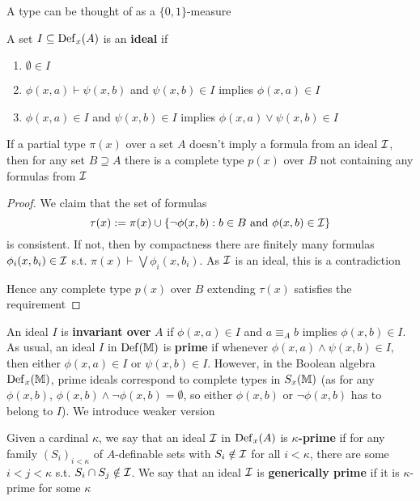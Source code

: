 \documentclass[11pt]{article}
\begin{document}
A type can be thought of as a \(\{0,1\}\)-measure

\begin{definition}[]
A set \(I\subseteq\operatorname{Def}_x(A)\) is an \textbf{ideal} if
\begin{enumerate}
\item \(\emptyset\in I\)
\item \(\phi(x,a)\vdash\psi(x,b)\) and \(\psi(x,b)\in I\) implies \(\phi(x,a)\in I\)
\item \(\phi(x,a)\in I\) and \(\psi(x,b)\in I\) implies \(\phi(x,a)\vee\psi(x,b)\in I\)
\end{enumerate}
\end{definition}

\begin{lemma}
If a partial type \(\pi(x)\) over a set \(A\) doesn't imply a formula from an ideal \(\mathcal{I}\), then
for any set \(B\supseteq A\) there is a complete type \(p(x)\) over \(B\) not containing any formulas
from \(\mathcal{I}\)
\end{lemma}

\begin{proof}
We claim that the set of formulas
\begin{equation*}
\tau(x):=\pi(x)\cup\{\neg\phi(x,b):b\in B\text{ and }\phi(x,b)\in\mathcal{I}\}
\end{equation*}
is consistent. If not, then by compactness there are finitely many formulas \(\phi_i(x,b_i)\in\mathcal{I}\)
s.t. \(\pi(x)\vdash\bigvee\phi_i(x,b_i)\). As \(\mathcal{I}\) is an ideal, this is a contradiction

Hence any complete type \(p(x)\) over \(B\) extending \(\tau(x)\) satisfies the requirement
\end{proof}

An ideal \(I\) is \textbf{invariant over} \(A\) if \(\phi(x,a)\in I\) and \(a\equiv_Ab\) implies \(\phi(x,b)\in I\). As
usual, an ideal \(I\) in \(\operatorname{Def}(\mathbb{M})\) is \textbf{prime} if whenever \(\phi(x,a)\wedge\psi(x,b)\in I\), then
either \(\phi(x,a)\in I\) or \(\psi(x,b)\in I\). However, in the Boolean algebra \(\operatorname{Def}_x(\mathbb{M})\), prime
ideals correspond to complete types in \(S_x(\mathbb{M})\) (as for any \(\phi(x,b)\), \(\phi(x,b)\wedge\neg\phi(x,b)=\emptyset\),
so either \(\phi(x,b)\) or \(\neg\phi(x,b)\) has to belong to \(I\)). We introduce weaker version

\begin{definition}[]
Given a cardinal \(\kappa\), we say that an ideal \(\mathcal{I}\) in \(\operatorname{Def}_x(A)\) is \textbf{\(\kappa\)-prime} if for any
family \((S_i)_{i<\kappa}\) of \(A\)-definable sets with \(S_i\notin\mathcal{I}\) for all \(i<\kappa\), there are
some \(i<j<\kappa\) s.t. \(S_i\cap S_j\notin\mathcal{I}\). We say that an ideal \(\mathcal{I}\) is \textbf{generically prime} if it is
\(\kappa\)-prime for some \(\kappa\)
\end{definition}
\end{document}
